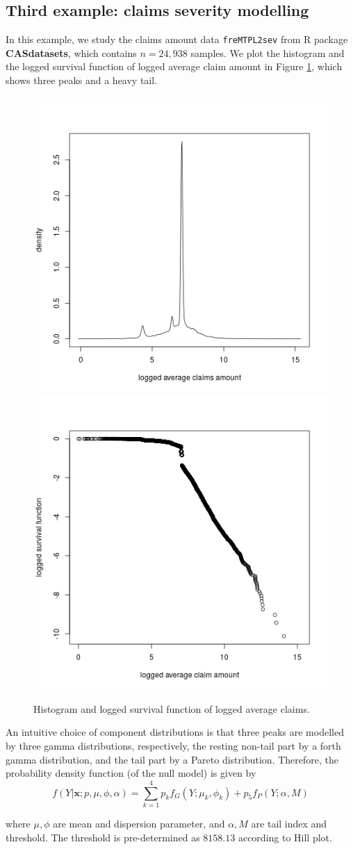\documentclass[11pt]{article}
\numberwithin{equation}{section}
\def\bx{\boldsymbol{x}}
\begin{document}
\subsection{Third example: claims severity modelling}
In this example, we study the claims amount data {\tt freMTPL2sev} from R package {\bf CASdatasets}, which contains $n=24,938$ samples. 
We plot the histogram and the logged survival function of logged average claim  amount in Figure \ref{tail}, which shows three peaks and a heavy tail. 
	\begin{figure}[h!]
		\centering
		\includegraphics[width=0.45\linewidth]{../plots/sev/hist.png}
		\includegraphics[width=0.45\linewidth]{../plots/sev/log-log.png}
		\caption{Histogram and logged survival function of logged average claims.}\label{tail}
	\end{figure}
An intuitive choice of component distributions is that 
three peaks are modelled by three gamma distributions, respectively, the resting non-tail part by a forth gamma distribution, and the tail part by a Pareto distribution.
Therefore, the probability density function (of the null model) is given by
\begin{equation}\label{sev-0}
	f(Y|\bx;p,\mu,\phi,\alpha)=\sum_{k=1}^4p_kf_{G}(Y;\mu_k,\phi_k)+p_5f_{P}(Y;\alpha,M)
\end{equation}

	where $\mu,\phi$ are mean and dispersion parameter, and $\alpha, M$ are tail index and threshold. The threshold is pre-determined as $8158.13$ according to Hill plot.
	
\end{document}
